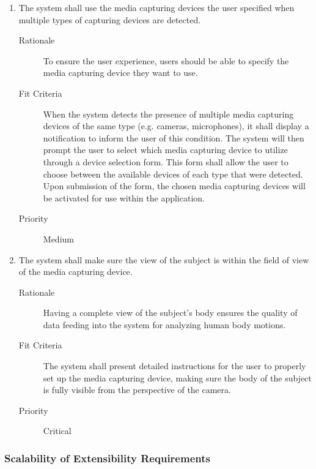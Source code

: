 \documentclass{article}
\begin{document}
\begin{enumerate}[label=\textbf{PR\arabic*}]
\item The system shall use the media capturing devices the user specified when
  multiple types of capturing devices are detected. \label{PR13}
	\begin{description}
  \item[Rationale] To ensure the user experience, users should be able to specify
    the media capturing device they want to use.
	\item[Fit Criteria] When the system detects the presence of multiple media
    capturing devices of the same type (e.g. cameras, microphones), it shall
    display a notification to inform the user of this condition. The system will
    then prompt the user to select which media capturing device to utilize
    through a device selection form. This form shall allow the user to choose
    between the available devices of each type that were detected. Upon
    submission of the form, the chosen media capturing devices will be activated
    for use within the application.
	\item[Priority] Medium
  \end{description}
\item The system shall make sure the view of the subject is within the field of
  view of the media capturing device. \label{PR15}
	\begin{description}
  \item[Rationale] Having a complete view of the subject's body ensures the quality
    of data feeding into the system for analyzing human body motions.
	\item[Fit Criteria] The system shall present detailed instructions for the user
    to properly set up the media capturing device, making sure the body of the
    subject is fully visible from the perspective of the camera.
  \item[Priority] Critical
  \end{description}
\end{enumerate}

\subsubsection{Scalability of Extensibility Requirements}
\end{document}
